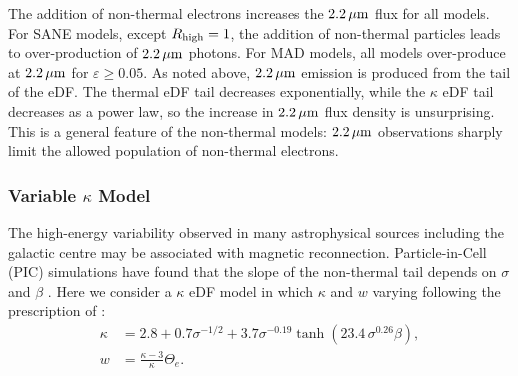 
The addition of non-thermal electrons increases the $2.2\,\mu\mathrm{m}$ flux for all models.
For SANE models, except $R_\mathrm{high}=1$, the addition of non-thermal particles leads to over-production of $2.2\,\mu\mathrm{m}$ photons.
For MAD models, all models over-produce at $2.2\,\mu\mathrm{m}$ for $\varepsilon \ge 0.05$.
As noted above, $2.2\,\mu\mathrm{m}$ emission is produced from the tail of the eDF.
The thermal eDF tail decreases exponentially, while the $\kappa$ eDF tail decreases as a power law, so the increase in $2.2\,\mu\mathrm{m}$ flux density is unsurprising.
This is a general feature of the non-thermal models: $2.2\,\mu\mathrm{m}$ observations sharply limit the allowed population of non-thermal electrons.

\subsubsection{Variable \texorpdfstring{$\kappa$}{kappa} Model}

The high-energy variability observed in many astrophysical sources including the galactic centre
may be associated with 
magnetic reconnection.
Particle-in-Cell (PIC) simulations have found that the slope of the non-thermal tail depends on  $\sigma$ and $\beta$ \citep[see, e.g.,][]{2018ApJ...862...80B}.  Here we consider a $\kappa$ eDF model in which $\kappa$ and $w$ varying following the prescription of \cite{2018ApJ...862...80B}:
\begin{align}
  \kappa &= 2.8 +0.7\sigma^{-1/2} + 3.7\sigma^{-0.19}\tanh{(23.4\,\sigma^{0.26}\beta)}, \label{eq:kappa}\\
  w      &= \frac{ \kappa -3 }{\kappa} \Theta_e.
\end{align}

